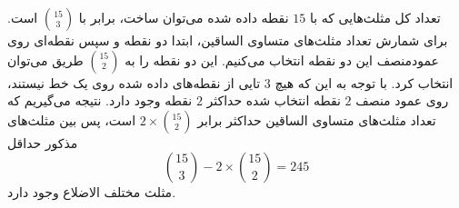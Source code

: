 \p
تعداد کل مثلث‌هایی که با
$15$
 نقطه داده شده می‌توان ساخت، برابر با 
 \(\binom{15}{3}\)
  است. برای شمارش تعداد مثلث‌های متساوی الساقین، ابتدا دو نقطه و سپس نقطه‌ای روی عمودمنصف این دو نقطه انتخاب می‌کنیم. 
   این دو نقطه را به 
  \(\binom{15}{2}\)
   طریق می‌توان انتخاب کرد. با توجه به این که هیچ
$3$ 
   تایی از نقطه‌های داده شده روی یک خط نیستند، روی عمود منصف 
$2$ 
   نقطه انتخاب شده حداکثر 
$2$ 
   نقطه وجود دارد. نتیجه می‌گیریم که تعداد مثلث‌های متساوی الساقین حداکثر برابر 
   \(2\times\binom{15}{2}\)
    است، پس بین مثلث‌های مذکور حداقل
    $$\binom{15}{3} - 2\times\binom{15}{2} = 245$$
     مثلث مختلف الاضلاع وجود دارد.